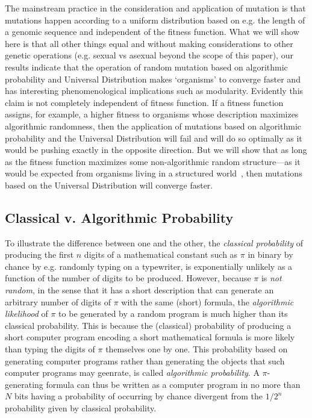 \documentclass[10pt]{article}
\begin{document}
The mainstream practice in the consideration and application of mutation is that mutations happen according to a uniform distribution based on e.g. the length of a genomic sequence and independent of the fitness function. What we will show here is that all other things equal and without making considerations to other genetic operations (e.g. sexual vs asexual beyond the scope of this paper), our results indicate that the operation of random mutation based on algorithmic probability and Universal Distribution makes `organisms' to converge faster and has interesting phenomenological implications such as modularity. Evidently this claim is not completely independent of fitness function. If a fitness function assigns, for example, a higher fitness to organisms whose description maximizes algorithmic randomness, then the application of mutations based on algorithmic probability and the Universal Distribution will fail and will do so optimally as it would be pushing exactly in the opposite direction. But we will show that as long as the fitness function maximizes some non-algorithmic random structure---as it would be expected from organisms living in a structured world~\cite{zenil1}, then mutations based on the Universal Distribution will converge faster.


\subsection{Classical v. Algorithmic Probability}

To illustrate the difference between one and the other, the \textit{classical probability} of producing the first $n$ digits of a mathematical constant such as $\pi$ in binary by chance by e.g. randomly typing on a typewriter, is exponentially unlikely as a function of the number of digits to be produced. However, because $\pi$ is \textit{not random}, in the sense that it has a short description that can generate an arbitrary number of digits of $\pi$ with the same (short) formula, the \textit{algorithmic likelihood} of $\pi$ to be generated by a random program is much higher than its classical probability. This is because the (classical) probability of producing a short computer program encoding a short mathematical formula is more likely than typing the digits of $\pi$ themselves one by one. This probability based on generating computer programs rather than generating the objects that such computer programs may geenrate, is called \textit{algorithmic probability}. A $\pi$-generating formula can thus be written as a computer program in no more than $N$ bits  having a probability of occurring by chance divergent from the $1/2^n$ probability given by classical probability.
\end{document}
